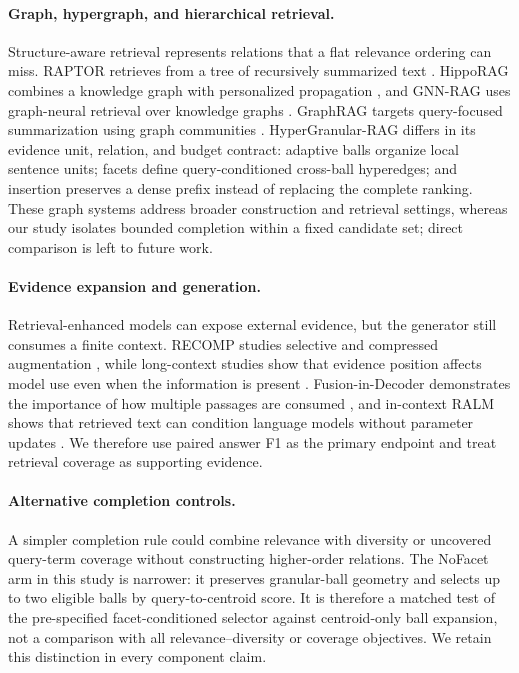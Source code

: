 \documentclass[11pt]{article}
\newcommand{\hgrag}{HyperGranular-RAG\xspace}
\begin{document}
\paragraph{Graph, hypergraph, and hierarchical retrieval.}
Structure-aware retrieval represents relations that a flat relevance ordering
can miss. RAPTOR retrieves from a tree of recursively summarized text
\citep{sarthi2024raptor}. HippoRAG combines a knowledge graph with personalized
propagation \citep{gutierrez2024hipporag}, and GNN-RAG uses graph-neural
retrieval over knowledge graphs \citep{mavromatis2025gnnrag}. GraphRAG targets
query-focused summarization using graph communities \citep{edge2024graphrag}.
\hgrag differs in its evidence unit, relation, and budget contract: adaptive
balls organize local sentence units; facets define query-conditioned
cross-ball hyperedges; and insertion preserves a dense prefix instead of
replacing the complete ranking. These graph systems address broader
construction and retrieval settings, whereas our study isolates bounded
completion within a fixed candidate set; direct comparison is left to future
work.

\paragraph{Evidence expansion and generation.}
Retrieval-enhanced models can expose external evidence, but the generator
still consumes a finite context. RECOMP studies selective and compressed
augmentation \citep{xu2024recomp}, while long-context studies show that
evidence position affects model use even when the information is present
\citep{liu2024lostmiddle}. Fusion-in-Decoder demonstrates the importance of
how multiple passages are consumed \citep{izacard2021fid}, and in-context RALM
shows that retrieved text can condition language models without parameter
updates \citep{ram2023incontext}. We therefore use paired answer F1 as the
primary endpoint and treat retrieval coverage as supporting evidence.

\paragraph{Alternative completion controls.}
A simpler completion rule could combine relevance with diversity or uncovered
query-term coverage without constructing higher-order relations. The NoFacet arm
in this study is narrower: it preserves granular-ball geometry and selects up
to two eligible balls by query-to-centroid score. It is therefore a matched
test of the pre-specified facet-conditioned selector against centroid-only ball
expansion, not a comparison with all relevance--diversity or coverage
objectives. We retain this distinction in every component claim.
\end{document}
